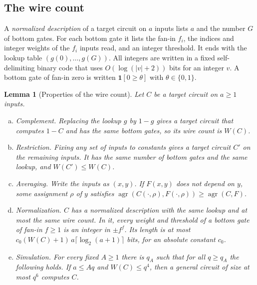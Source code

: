 \documentclass[11pt,letterpaper]{article}
\newtheorem{lemma}[theorem]{Lemma}
\theoremstyle{definition}
\theoremstyle{remark}
\newcommand{\agr}{\operatorname{agr}}
\newcommand{\ind}{\mathbf 1}
\newcommand{\lgx}{\log_2}
\begin{document}
\subsection{The wire count}\label{sec:ae-measure}

A \emph{normalized description} of a target circuit on \(a\) inputs
lists \(a\) and the number \(G\) of bottom gates. For each bottom gate it
lists the fan-in \(f_i\), the indices and integer weights of the
\(f_i\) inputs read, and an integer threshold. It ends with the lookup
table \((g(0),\dots,g(G))\). All integers are written in a fixed
self-delimiting binary code that uses \(O(\log(|v|+2))\) bits for an
integer \(v\). A bottom gate of fan-in zero is written
\(\ind[0\ge\theta]\) with \(\theta\in\{0,1\}\).

\begin{lemma}[Properties of the wire count]\label{lem:ae-wires}
Let \(C\) be a target circuit on \(a\ge1\) inputs.
\begin{enumerate}[(a)]
\item \emph{Complement.} Replacing the lookup \(g\) by \(1-g\) gives
a target circuit that computes \(1-C\) and has the same bottom gates,
so its wire count is \(W(C)\).
\item \emph{Restriction.} Fixing any set of inputs to constants gives
a target circuit \(C'\) on the remaining inputs. It has the same number
of bottom gates and the same lookup, and \(W(C')\le W(C)\).
\item \emph{Averaging.} Write the inputs as \((x,y)\). If
\(F(x,y)\) does not depend on \(y\), some assignment \(\rho\) of \(y\)
satisfies \(\agr(C(\cdot,\rho),F(\cdot,\rho))\ge\agr(C,F)\).
\item \emph{Normalization.} \(C\) has a normalized description with
the same lookup and at most the same wire count. In it, every weight
and threshold of a bottom gate of fan-in \(f\ge1\) is an integer in
\(\pm f^f\). Its length is at most
\(c_0(W(C)+1)\,a\lceil\lgx(a+1)\rceil\) bits, for an absolute
constant \(c_0\).
\item \emph{Simulation.} For every fixed \(A\ge1\) there is \(q_A\)
such that for all \(q\ge q_A\) the following holds. If \(a\le Aq\) and
\(W(C)\le q^4\), then a general circuit of size at most \(q^6\)
computes \(C\).
\end{enumerate}
\end{lemma}
\end{document}
